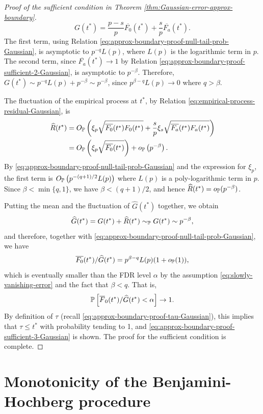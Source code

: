 \begin{proof}[Proof of the sufficient condition in Theorem \ref{thm:Gaussian-error-approx-boundary}]
\begin{equation} \label{eq:approx-boundary-proof-sufficient-4-Gaussian}
    G(t^*) = \frac{p-s}{p}\overline{F_0}(t^*) + \frac{s}{p}\overline{F_a}(t^*).
\end{equation}
The first term, using Relation \eqref{eq:approx-boundary-proof-null-tail-prob-Gaussian}, is asymptotic to $p^{-q}L(p)$, where $L(p)$ is the logarithmic term in $p$.
The second term, since $\overline{F_a}(t^*)\to 1$ by Relation \eqref{eq:approx-boundary-proof-sufficient-2-Gaussian}, is asymptotic to $p^{-\beta}$.
Therefore, $G(t^*) \sim p^{-q}L(p) + p^{-\beta} \sim p^{-\beta}$, since 
$p^{\beta-q}L(p)\to0$ where $q>\beta$.

The fluctuation of the empirical process at $t^*$, by Relation \eqref{eq:empirical-process-residual-Gaussian}, is 
\begin{align*}
    \widehat{R}(t^*) 
    &= O_\P\left(\xi_p\sqrt{\overline{F_0}(t^*)F_0(t^*)} + \frac{s}{p}\xi_s\sqrt{\overline{F_a}(t^*)F_a(t^*)}\right)\\
    &= O_\P\left(\xi_p\sqrt{\overline{F_0}(t^*)}\right) + o_\P\left(p^{-\beta}\right).
\end{align*}
By \eqref{eq:approx-boundary-proof-null-tail-prob-Gaussian} and the expression for $\xi_p$, the first term is $O_\P\left(p^{-(q+1)/2}L(p)\right)$ where $L(p)$ is a poly-logarithmic term in $p$.
Since $\beta<\min\{q,1\}$, we have $\beta<(q+1)/2$, and hence $\widehat{R}(t^*) = o_\P(p^{-\beta})$.

Putting the mean and the fluctuation of $\widehat{G}(t^*)$ together, we obtain
$$
\widehat{G}(t^*) = G(t^*) + \widehat{R}(t^*) \sim_\P G(t^*) \sim p^{-\beta},
$$
and therefore, together with \eqref{eq:approx-boundary-proof-null-tail-prob-Gaussian}, we have
$$
\overline{F_0}(t^*)/\widehat{G}(t^*) = p^{\beta-q}L(p)(1+o_{\P}(1)),
$$
which is eventually smaller than the FDR level $\alpha$ by the assumption \eqref{eq:slowly-vanishing-error} and the fact that $\beta<q$.
That is, 
$$
\P\left[\overline{F}_0(t^*) / \widehat{G}(t^*) < \alpha\right] \to 1.
$$
By definition of $\tau$ (recall \eqref{eq:approx-boundary-proof-tau-Gaussian}), this implies that $\tau \le t^*$ with probability tending to 1, and \eqref{eq:approx-boundary-proof-sufficient-3-Gaussian} is shown.
The proof for the sufficient condition is complete.
\end{proof}


\section{Monotonicity of the Benjamini-Hochberg procedure}
\label{sec:BH-monotonicity}



